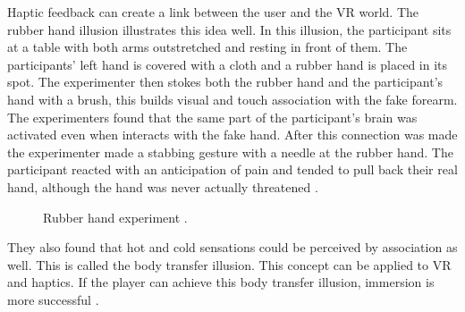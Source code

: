 Haptic feedback can create a link between the user and the VR world. The rubber hand illusion illustrates this idea well. In this illusion, the participant sits at a table with both arms outstretched and resting in front of them. The participants' left hand is covered with a cloth and a rubber hand is placed in its spot. The experimenter then stokes both the rubber hand and the participant's hand with a brush, this builds visual and touch association with the fake forearm. The experimenters found that the same part of the participant's brain was activated even when interacts with the fake hand. After this connection was made the experimenter made a stabbing gesture with a needle at the rubber hand. The participant reacted with an anticipation of pain and tended to pull back their real hand, although the hand was never actually threatened \cite{LaValle2017}. 
\begin{figure}[!ht]
	\begin{center}
	\end{center}
	\caption{Rubber hand experiment \cite{LaValle2017}.} \label{fig:RubberHand}
\end{figure}They also found that hot and cold sensations could be perceived by association as well. This is called the body transfer illusion. This concept can be applied to VR and haptics. If the player can achieve this body transfer illusion, immersion is more successful \cite{LaValle2017}. 

